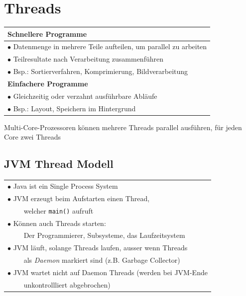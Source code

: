 {\small
\section{Threads}
    \begin{tabular}{l}
        \rowcolor[RGB]{239,239,239} 
        \textbf{Schnellere Programme}\\\hline
        $\bullet$ Datenmenge in mehrere Teile aufteilen, um parallel zu arbeiten\\
        $\bullet$ Teilresultate nach Verarbeitung zusammenführen\\
        $\bullet$ Bsp.: Sortierverfahren, Komprimierung, Bildverarbeitung\\
        \rowcolor[RGB]{239,239,239}
        \textbf{Einfachere Programme}\\\hline
        $\bullet$ Gleichzeitig oder verzahnt ausführbare Abläufe\\
        $\bullet$ Bsp.: Layout, Speichern im Hintergrund\\
    \end{tabular}
    Multi-Core-Prozessoren können mehrere Threads parallel ausführen, für jeden Core zwei Threads
    \vspace{-0.3cm}

\subsection{JVM Thread Modell}
    \begin{tabular}{l}
        $\bullet$ Java ist ein Single Process System\\
        $\bullet$ JVM erzeugt beim Aufstarten einen Thread,\\
        $\qquad$ welcher \verb|main()| aufruft\\
        $\bullet$ Können auch Threads starten:\\
        $\qquad$ Der Programmierer, Subsysteme, das Laufzeitsystem\\
        $\bullet$ JVM läuft, solange Threads laufen, ausser wenn Threads\\
        $\qquad$ als \textit{Daemon} markiert sind (z.B. Garbage Collector)\\
        $\bullet$ JVM wartet nicht auf Daemon Threads (werden bei JVM-Ende\\
        $\qquad$ unkontrollliert abgebrochen)\\
    \end{tabular}
    \vspace{-0.3cm}

}
